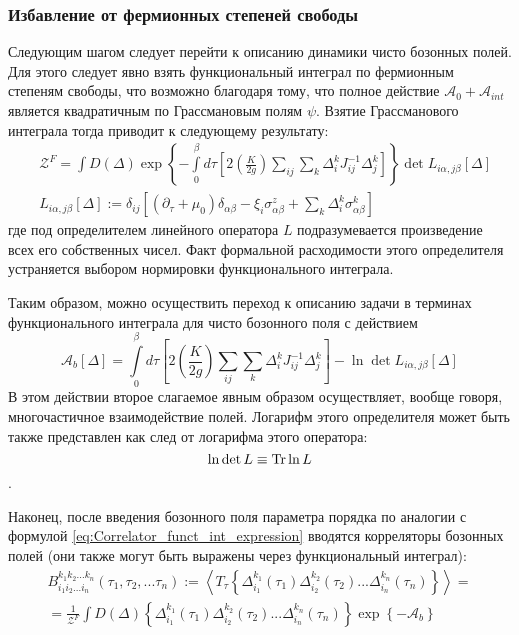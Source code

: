 \subsubsection{Избавление от фермионных степеней свободы}
Следующим шагом следует перейти к описанию динамики чисто бозонных полей. Для этого следует явно взять функциональный интеграл по фермионным степеням свободы, что возможно благодаря тому, что полное действие $\mathcal{A}_0 + \mathcal{A}_{int}$ является квадратичным по Грассмановым полям $\psi$. Взятие Грассманового интеграла тогда приводит к следующему результату:
\begin{align}
	\label{eq:Part_sum_thorugh_boson_functional_integral}
	& \mathcal{Z}^F = \int D(\Delta) \exp\left\{ -\int\limits_{0}^{\beta} d\tau \left[ 2 \left(\frac{K}{2g}\right) \sum_{ij} \sum_k \Delta^k_i J^{-1}_{ij} \Delta^k_j \right]
	 \right\} \det L_{i\alpha,j\beta} \left[ \Delta \right] \\
	\label{eq:Fermion_linear_operator}
	& L_{i\alpha,j\beta} \left[ \Delta \right] := \delta_{ij} \left[ \left(\partial_\tau + \mu_0 \right) \delta_{\alpha\beta} - \xi_i \sigma^z_{\alpha\beta} + \sum_k \Delta^k_i \sigma^k_{\alpha\beta} \right]
\end{align}
где под определителем линейного оператора $L$ подразумевается произведение всех его собственных чисел. Факт формальной расходимости этого определителя устраняется выбором нормировки функционального интеграла. 

Таким образом, можно осуществить переход к описанию задачи в терминах функционального интеграла для чисто бозонного поля с действием
\begin{equation}
	\label{eq:Boson_action}
	\mathcal{A}_{b} \left[ \Delta \right] = \int\limits_{0}^{\beta} d\tau \left[ 2 \left(\frac{K}{2g}\right) \sum_{ij} \sum_k \Delta^k_i J^{-1}_{ij} \Delta^k_j \right] - \ln \det L_{i\alpha,j\beta} \left[ \Delta \right]
\end{equation}
В этом действии второе слагаемое явным образом осуществляет, вообще говоря, многочастичное взаимодействие полей.
Логарифм этого определителя может быть также представлен как след от логарифма этого оператора: $$\ln \det L \equiv \operatorname{Tr} \ln L$$. 

Наконец, после введения бозонного поля параметра порядка по аналогии с формулой \eqref{eq:Correlator_funct_int_expression} вводятся корреляторы бозонных полей (они также могут быть выражены через функциональный интеграл):
\begin{equation}
	\label{eq:Boson_correlator_definition}
	\begin{split}
		B^{k_1 k_2 ... k_n}_{i_1 i_2 ... i_n} \left( \tau_1, \tau_2, ... \tau_n \right) := \left\langle T_\tau\left\{ \Delta^{k_1}_{i_1}(\tau_1) \Delta^{k_2}_{i_2}(\tau_2) ...\Delta^{k_n}_{i_n}(\tau_n) \right\} \right\rangle = \\
		= \frac{1}{\mathcal{Z}^F} \int D(\Delta) \left\{ \Delta^{k_1}_{i_1}(\tau_1) \Delta^{k_2}_{i_2}(\tau_2) ...\Delta^{k_n}_{i_n}(\tau_n) \right\} \exp\left\{ -\mathcal{A}_{b} \right\}
	\end{split}	
\end{equation}


